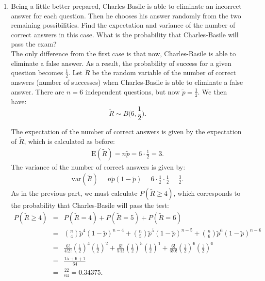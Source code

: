 \documentclass[12pt,thmsa]{article}\usepackage[]{graphicx}\usepackage[]{color}
\begin{document}
\begin{enumerate}
\item Being a little better prepared, Charles-Basile is able to eliminate an incorrect answer for each question. Then he chooses his answer randomly from the two remaining possibilities.
Find the expectation and variance of the number of correct answers in this case.
What is the probability that Charles-Basile will pass the exam?\\

The only difference from the first case is that now, Charles-Basile is able to eliminate a false answer. As a result, the probability of success for a given question becomes $\frac{1}{2}$.
Let $ \tilde{R} $ be the random variable of the number of correct answers (number of successes) when Charles-Basile is able to eliminate a false answer. There are $ n = 6 $ independent questions, but now $ \tilde{p} = \frac{1}{2} $. We then have: $$ \tilde{R} \sim B \big(6, \frac{1}{2} \big). $$

The expectation of the number of correct answers is given by the expectation of $ \tilde{R} $, which is calculated as before:
\begin{eqnarray*}
   \text{E}(\tilde{R})=n\tilde{p}=6 \cdot \frac{1}{2}=3.
  \end{eqnarray*}
The variance of the number of correct answers is given by:
\begin{eqnarray*}
\text{var}(\tilde{R})=n\tilde{p}(1-\tilde{p})=6 \cdot \frac{1}{2}\cdot \frac{1}{2}=\frac{3}{2}.
\end{eqnarray*}
As in the previous part, we must calculate $P(\tilde{R} \geq 4) $, which corresponds to the probability that Charles-Basile will pass the test:
 \begin{eqnarray*}
   P(\tilde{R}\geq 4) & = & \left. P(\tilde{R}=4) + P(\tilde{R}=5) + P(\tilde{R}=6) \right. \nonumber \\
   & = & \left. \binom{n}{4}\tilde{p}^{4}(1-\tilde{p})^{n-4} + \binom{n}{5}\tilde{p}^{5}(1-\tilde{p})^{n-5} + \binom{n}{6}\tilde{p}^{6}(1-\tilde{p})^{n-6} \right. \nonumber \\
   & = & \left.  \frac{6!}{4!2!}\left(\frac{1}{2}\right)^{4}\left(\frac{1}{2}\right)^{2} + \frac{6!}{5!1!}\left(\frac{1}{2}\right)^{5}\left(\frac{1}{2}\right)^{1} + \frac{6!}{6!0!}\left(\frac{1}{2}\right)^{6}\left(\frac{1}{2}\right)^{0} \right. \nonumber \\
     & = & \left.  \frac{15+6+1}{64}  \right. \nonumber \\
   & = & \left. \frac{22}{64} = 0.34375. \right. \nonumber \\
  \end{eqnarray*}

\end{enumerate}
\end{document}
